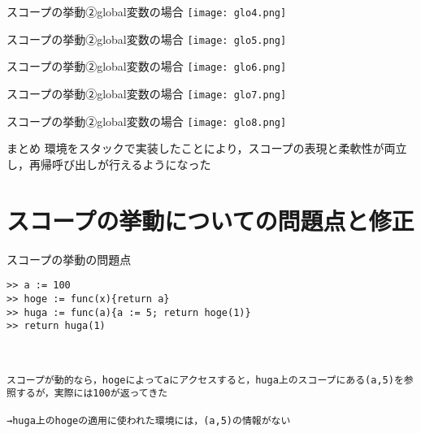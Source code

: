 \documentclass[uplatex,dvipdfmx,ja=standard]{beamer}
\begin{document}
\begin{frame}[fragile]{スコープの挙動②global変数の場合}
    \centering 
    \texttt{[image: glo4.png]}
\end{frame}

\begin{frame}[fragile]{スコープの挙動②global変数の場合}
    \centering 
    \texttt{[image: glo5.png]}
\end{frame}

\begin{frame}[fragile]{スコープの挙動②global変数の場合}
    \centering 
    \texttt{[image: glo6.png]}
\end{frame}

\begin{frame}[fragile]{スコープの挙動②global変数の場合}
    \centering 
    \texttt{[image: glo7.png]}
\end{frame}

\begin{frame}[fragile]{スコープの挙動②global変数の場合}
    \centering 
    \texttt{[image: glo8.png]}
\end{frame}

\begin{frame}{まとめ}
環境をスタックで実装したことにより，スコープの表現と柔軟性が両立し，再帰呼び出しが行えるようになった
\end{frame}

\section{スコープの挙動についての問題点と修正}


\begin{frame}[fragile]{スコープの挙動の問題点}
    \begin{verbatim}
>> a := 100
>> hoge := func(x){return a}
>> huga := func(a){a := 5; return hoge(1)}
>> return huga(1)
    


スコープが動的なら，hogeによってaにアクセスすると，huga上のスコープにある(a,5)を参照するが，実際には100が返ってきた

→huga上のhogeの適用に使われた環境には，(a,5)の情報がない
    \end{verbatim}
\end{frame}
\end{document}
